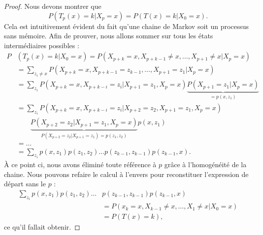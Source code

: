 \begin{proof}
	Nous devons montrer que
	\begin{equation}
		P(T_p(x)=k|X_p=x)=P(T(x)=k|X_0=x).
	\end{equation}
	Cela est intuitivement évident du fait qu'une chaine de Markov soit un processus sans mémoire. Afin de prouver, nous allons sommer sur tous les états intermédiaires possibles :
	\begin{subequations}
		\begin{align}
			P & (T_p(x)=k|X_0=x)=P(X_{p+k}=x,X_{p+k-1}\neq x,\ldots,X_{p+1}\neq x|X_p=x)                             \\
			  & =\sum_{z_i\neq x}P(X_{p+k}=x,X_{p+k-1}=z_{k-1},\ldots,X_{p+1}=z_1|X_p=x)                             \\
			  & =\sum_{z_i}P(X_{p+k}=x,X_{p+k-i}=z_i|X_{p+1}=z_1,X_p=x)\underbrace{P(X_{p+1}=z_1|X_p=x)}_{=p(x,z_1)} \\
			  & =\sum_{z_i}P(X_{p+k}=x,X_{p+k-i}=z_i|X_{p+2}=z_2,X_{p+1}=z_1,X_p=x)                                  \\
			  & \qquad\underbrace{P(X_{p+2}=z_2|X_{p+1}=z_1,X_p=x)}_{P(X_{p+2}=z_2|X_{p+1}=z_1)=p(z_1,z_2)}p(x,z_1)  \\
			  & =\ldots                                                                                              \\
			  & =\sum_{z_i}p(x,z_1)p(z_1,z_2)\ldots p(z_{k-1},z_{k-1})p(z_{k-1},x).
		\end{align}
	\end{subequations}
	À ce point ci, nous avons éliminé toute référence à \( p\) grâce à l'homogénéité de la chaine. Nous pouvons refaire le calcul à l'envers pour reconstituer l'expression de départ sans le \( p\) :
	\begin{subequations}
		\begin{align}
			\sum_{z_i}p(x,z_1)p(z_1,z_2)\ldots & p(z_{k-1},z_{k-1})p(z_{k-1},x)                 \\
			                                   & =P(x_k=x,X_{k-1}\neq x,\ldots,X_1\neq x|X_0=x) \\
			                                   & =P(T(x)=k),
		\end{align}
	\end{subequations}
	ce qu'il fallait obtenir.
\end{proof}

